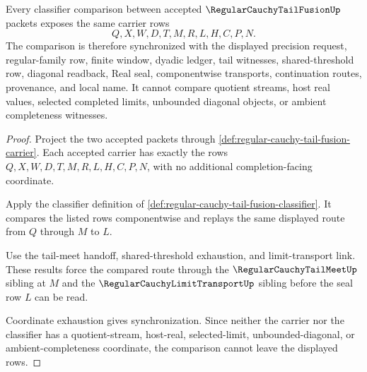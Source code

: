 \begin{theorem}
\label{thm:regular-cauchy-tail-fusion-carrier-classifier-synchronization}
Every classifier comparison between accepted $\RegularCauchyTailFusionUp$ packets exposes the same carrier rows
$$
Q,X,W,D,T,M,R,L,H,C,P,N.
$$
The comparison is therefore synchronized with the displayed precision request, regular-family row, finite window, dyadic ledger, tail witnesses, shared-threshold row, diagonal readback, Real seal, componentwise transports, continuation routes, provenance, and local name. It cannot compare quotient streams, host real values, selected completed limits, unbounded diagonal objects, or ambient completeness witnesses.
\end{theorem}
\begin{proof}
Project the two accepted packets through \autoref{def:regular-cauchy-tail-fusion-carrier}. Each accepted carrier has exactly the rows $Q,X,W,D,T,M,R,L,H,C,P,N$, with no additional completion-facing coordinate.

Apply the classifier definition of \autoref{def:regular-cauchy-tail-fusion-classifier}. It compares the listed rows componentwise and replays the same displayed route from $Q$ through $M$ to $L$.

Use the tail-meet handoff, shared-threshold exhaustion, and limit-transport link. These results force the compared route through the $\RegularCauchyTailMeetUp$ sibling at $M$ and the $\RegularCauchyLimitTransportUp$ sibling before the seal row $L$ can be read.

Coordinate exhaustion gives synchronization. Since neither the carrier nor the classifier has a quotient-stream, host-real, selected-limit, unbounded-diagonal, or ambient-completeness coordinate, the comparison cannot leave the displayed rows.
\end{proof}

